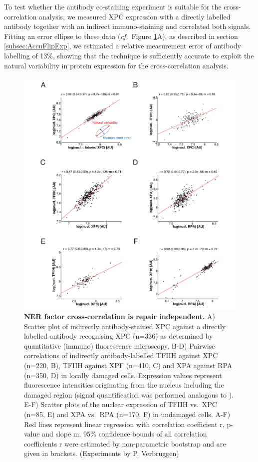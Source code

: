 To test whether the antibody co-staining experiment is suitable for the cross-correlation analysis, we measured XPC expression with a directly labelled antibody together with an indirect immuno-staining and correlated both signals. Fitting an error ellipse to these data (\textit{cf.}\ Figure \ref{fig:coExpressionData}A), as described in section  \ref{subsec:AccuFlipExp}, we estimated a relative measurement error of antibody labelling of 13\%, showing that the technique is sufficiently accurate to exploit the natural variability in protein expression for the cross-correlation analysis.
\begin{figure}[htbp]
	\begin{center}
		\includegraphics[width=1\textwidth]{Abbildungen/figureTAC_2.pdf}
		\caption{\textbf{NER factor cross-correlation is repair independent.} A) Scatter plot of indirectly antibody-stained XPC against a directly labelled antibody recognising XPC (n=336) as determined by quantitative (immuno) fluorescence microscopy. B-D) Pairwise correlations of indirectly antibody-labelled TFIIH against XPC (n=220, B), TFIIH against XPF (n=410, C) and XPA against RPA (n=350, D) in locally damaged cells. Expression values represent fluorescence intensities originating from the nucleus including the damaged region (signal quantification was performed analogous to \cite{Luijsterburg2010}). E-F) Scatter plots of the nuclear expression of TFIIH vs.\ XPC (n=85, E) and XPA vs.\ RPA (n=170, F) in undamaged cells. A-F) Red lines represent linear regression with correlation coefficient r, p-value and slope m. 95\% confidence bounds of all correlation coefficients r were estimated by non-parametric bootstrap and are given in brackets. (Experiments by P. Verbruggen)}
		\label{fig:coExpressionData}
	\end{center}
\end{figure}

